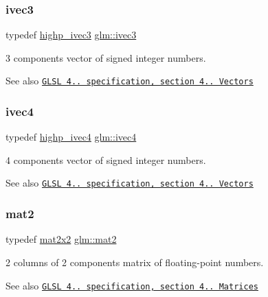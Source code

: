 \subsubsection{\texorpdfstring{ivec3}{ivec3}}
{\footnotesize\ttfamily typedef \mbox{\hyperlink{group__core__precision_ga52ba3edf3183078cf4129e6193b32a2c}{highp\+\_\+ivec3}} \mbox{\hyperlink{group__core__types_ga6e12a4ca00d696f07da1df4eb73e0fe8}{glm\+::ivec3}}}

3 components vector of signed integer numbers.

\begin{DoxySeeAlso}{See also}
\href{http://www.opengl.org/registry/doc/GLSLangSpec.4.20.8.pdf}{\tt G\+L\+SL 4.. specification, section 4.. Vectors} 
\end{DoxySeeAlso}
\mbox{\label{group__core__types_gaa4560ddc50320ea8f8a70d5c9c249fea}} 
\subsubsection{\texorpdfstring{ivec4}{ivec4}}
{\footnotesize\ttfamily typedef \mbox{\hyperlink{group__core__precision_gaff761e336e3b52f04e725fa85c6d36d1}{highp\+\_\+ivec4}} \mbox{\hyperlink{group__core__types_gaa4560ddc50320ea8f8a70d5c9c249fea}{glm\+::ivec4}}}

4 components vector of signed integer numbers.

\begin{DoxySeeAlso}{See also}
\href{http://www.opengl.org/registry/doc/GLSLangSpec.4.20.8.pdf}{\tt G\+L\+SL 4.. specification, section 4.. Vectors} 
\end{DoxySeeAlso}
\mbox{\label{group__core__types_ga8357ec0aab6f8cf69313592492663c3f}} 
\subsubsection{\texorpdfstring{mat2}{mat2}}
{\footnotesize\ttfamily typedef \mbox{\hyperlink{group__core__types_gaeddc14adb4963d9bad73866cc202fb40}{mat2x2}} \mbox{\hyperlink{group__core__types_ga8357ec0aab6f8cf69313592492663c3f}{glm\+::mat2}}}

2 columns of 2 components matrix of floating-\/point numbers.

\begin{DoxySeeAlso}{See also}
\href{http://www.opengl.org/registry/doc/GLSLangSpec.4.20.8.pdf}{\tt G\+L\+SL 4.. specification, section 4.. Matrices} 
\end{DoxySeeAlso}
\mbox{\label{group__core__types_gaeddc14adb4963d9bad73866cc202fb40}} 
